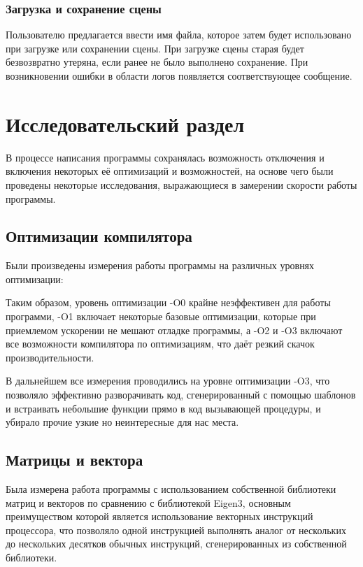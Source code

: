 \documentclass[a4paper,12pt]{report}
\numberwithin{equation}{section}
\begin{document}
\subsubsection{Загрузка и сохранение сцены}
Пользователю предлагается ввести имя файла, которое затем будет использовано при загрузке или сохранении сцены. При загрузке сцены старая будет безвозвратно утеряна, если ранее не было выполнено сохранение. При возникновении ошибки в области логов появляется соответствующее сообщение.

\section{Исследовательский раздел}
В процессе написания программы сохранялась возможность отключения и включения некоторых её оптимизаций и возможностей, на основе чего были проведены некоторые исследования, выражающиеся в замерении скорости работы программы.

\subsection{Оптимизации компилятора}
Были произведены измерения работы программы на различных уровнях оптимизации:


Таким образом, уровень оптимизации -O0 крайне неэффективен для работы программи, -O1 включает некоторые базовые оптимизации, которые при приемлемом ускорении не мешают отладке программы, а -O2 и -O3 включают все возможности компилятора по оптимизациям, что даёт резкий скачок производительности.

В дальнейшем все измерения проводились на уровне оптимизации -O3, что позволяло эффективно разворачивать код, сгенерированный с помощью шаблонов и встраивать небольшие функции прямо в код вызывающей процедуры, и убирало прочие узкие но неинтересные для нас места.

\subsection{Матрицы и вектора}
Была измерена работа программы с использованием собственной библиотеки матриц и векторов по сравнению с библиотекой Eigen3, основным преимуществом которой является использование векторных инструкций процессора, что позволяло одной инструкцией выполнять аналог от нескольких до нескольких десятков обычных инструкций, сгенерированных из собственной библиотеки.
\end{document}
